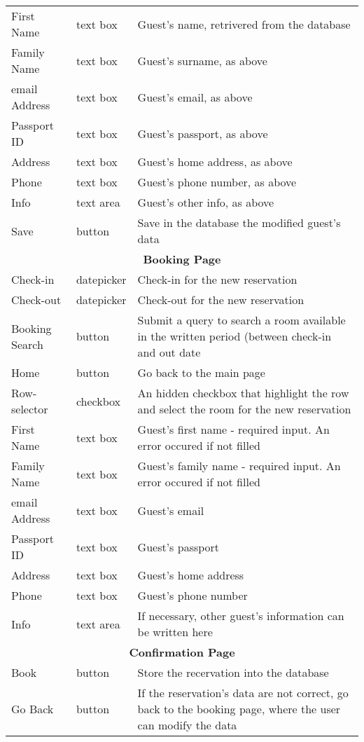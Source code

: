 \documentclass{article}
\begin{document}
\begin{center}
\begin{longtable}{| l | l | p{7cm} |}
	First Name		& text box		& Guest's name, retrivered from the database \\
	Family Name		& text box		& Guest's surname, as above \\
	email Address	& text box		& Guest's email, as above \\
	Passport ID		& text box		& Guest's passport, as above \\
	Address			& text box		& Guest's home address, as above \\
	Phone			& text box		& Guest's phone number, as above \\
	Info			& text area		& Guest's other info, as above \\
	Save			& button		& Save in the database the modified guest's data \\
	\hline \hline
	\multicolumn{3}{|c|}{\textbf{Booking Page}} \\ 
	\hline \hline
	Check-in		& datepicker	& Check-in for the new reservation \\
	Check-out		& datepicker	& Check-out for the new reservation \\
	Booking Search	& button		& Submit a query to search a room available in the written period (between check-in and out date \\
	Home			& button		& Go back to the main page \\
	\hline
	Row-selector	& checkbox		& An hidden checkbox that highlight the row and select the room for the new reservation \\
	First Name		& text box 		& Guest's first name - required input. An error occured if not filled \\
	Family Name		& text box 		& Guest's family name - required input. An error occured if not filled \\
	email Address	& text box		& Guest's email \\
	Passport ID		& text box		& Guest's passport \\
	Address			& text box		& Guest's home address \\
	Phone			& text box		& Guest's phone number \\
	Info			& text area		& If necessary, other guest's information can be written here \\
	\hline \hline
	\multicolumn{3}{|c|}{\textbf{Confirmation Page}} \\
	\hline \hline
	Book			& button		& Store the recervation into the database \\
	Go Back			& button		& If the reservation's data are not correct, go back to the booking page, where the user can modify the data \\

\end{longtable}
\end{center}
\end{document}
